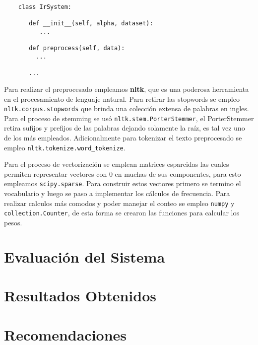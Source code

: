 \documentclass[runningheads,a4paper]{llncs}
\begin{document}
\noindent
%
\begin{verbatim}
	class IrSystem:
	   
	   def __init__(self, alpha, dataset):
	      ...
	      
	   def preprocess(self, data):
	     ...
	     
	   ...
\end{verbatim}
%
\noindent

Para realizar el preprocesado empleamos \textbf{nltk}, que es una poderosa herramienta en el procesamiento de lenguaje natural. Para retirar las stopwords se empleo \verb*|nltk.corpus.stopwords| que brinda una colección extensa de palabras en ingles. Para el proceso de stemming se usó \verb*|nltk.stem.PorterStemmer|, el PorterStemmer retira sufijos y prefijos de las palabras dejando solamente la raíz, es tal vez uno de los más empleados. Adicionalmente para tokenizar el texto preprocesado se empleo \verb*|nltk.tokenize.word_tokenize|.

Para el proceso de vectorización se emplean matrices esparcidas las cuales permiten representar vectores con 0 en muchas de sus componentes, para esto empleamos \verb*|scipy.sparse|. Para construir estos vectores primero se termino el vocabulario y luego se paso a implementar los cálculos de frecuencia. Para realizar calculos más comodos y poder manejar el conteo se empleo \verb*|numpy| y \verb*|collection.Counter|, de esta forma se crearon las funciones para calcular los pesos.



\section{Evaluación del Sistema}

\section{Resultados Obtenidos}

\section{Recomendaciones}
\end{document}
